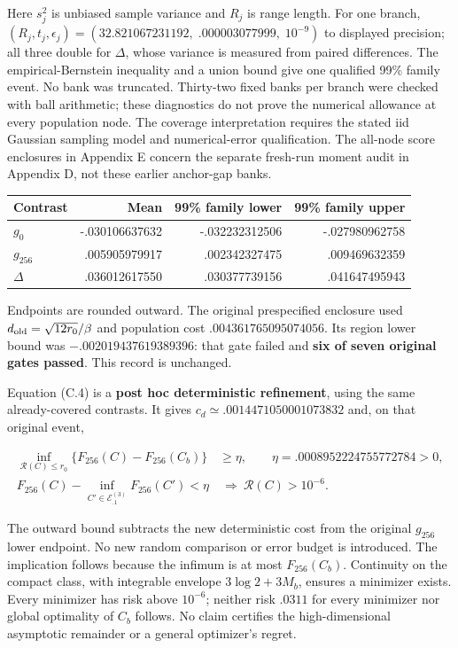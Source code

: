 \documentclass{article}
\begin{document}
Here \(s_j^2\) is unbiased sample variance and \(R_j\) is range length.
For one branch,
\((R_j,t_j,\epsilon_j)=(32.821067231192,\; .000003077999,\;10^{-9})\) to
displayed precision; all three double for \(\Delta\), whose variance is
measured from paired differences. The empirical-Bernstein inequality
\citep[Theorem 4]{maurer2009} and a union bound give one qualified 99\%
family event. No bank was truncated. Thirty-two fixed banks per branch
were checked with ball arithmetic; these diagnostics do not prove the
numerical allowance at every population node. The coverage
interpretation requires the stated iid Gaussian sampling model and
numerical-error qualification. The all-node score enclosures in Appendix
E concern the separate fresh-run moment audit in Appendix D, not these
earlier anchor-gap banks.

\begin{longtable}[]{@{}lrrr@{}}
\toprule\noalign{}
Contrast & Mean & 99\% family lower & 99\% family upper \\
\midrule\noalign{}
\endhead
\bottomrule\noalign{}
\endlastfoot
\(g_0\) & -.030106637632 & -.032232312506 & -.027980962758 \\
\(g_{256}\) & .005905979917 & .002342327475 & .009469632359 \\
\(\Delta\) & .036012617550 & .030377739156 & .041647495943 \\
\end{longtable}

Endpoints are rounded outward. The original prespecified enclosure used
\(d_{\rm old}=\sqrt{12r_0}/\beta\) and population cost
\(.004361765095074056\). Its region lower bound was
\(-.002019437619389396\): that gate failed and \textbf{six of seven
original gates passed}. This record is unchanged.

Equation (C.4) is a \textbf{post hoc deterministic refinement}, using
the same already-covered contrasts. It gives
\(c_d\simeq.0014471050001073832\) and, on that original event,

\[
\begin{aligned}
\inf_{\mathcal R(C)\le r_0}\{F_{256}(C)-F_{256}(C_b)\}&\ge\eta,
\qquad\eta=.0008952224755772784>0,\\
F_{256}(C)-\inf_{C'\in\mathcal E_{.1}^{(3)}}F_{256}(C')<\eta
&\ \Longrightarrow\ \mathcal R(C)>10^{-6}.
\end{aligned}
\tag{C.7}
\]

The outward bound subtracts the new deterministic cost from the original
\(g_{256}\) lower endpoint. No new random comparison or error budget is
introduced. The implication follows because the infimum is at most
\(F_{256}(C_b)\). Continuity on the compact class, with integrable
envelope \(3\log2+3M_b\), ensures a minimizer exists. Every minimizer
has risk above \(10^{-6}\); neither risk \(.0311\) for every minimizer
nor global optimality of \(C_b\) follows. No claim certifies the
high-dimensional asymptotic remainder or a general optimizer's regret.
\end{document}
